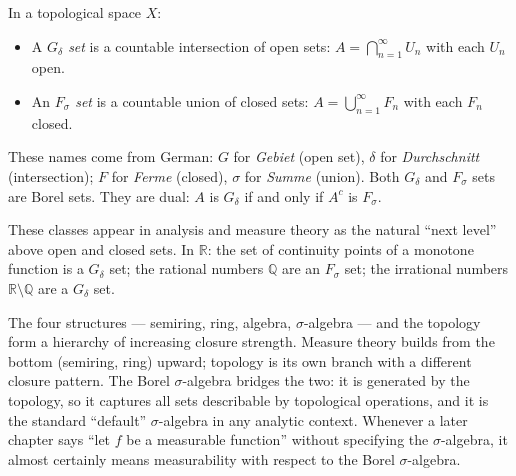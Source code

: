 \begin{example*}
\label{ex:Fsigma-Gdelta}
In a topological space $X$:
\begin{itemize}
\item A \emph{$G_\delta$ set} is a countable intersection of open sets:
  $A = \bigcap_{n=1}^\infty U_n$ with each $U_n$ open.
\item An \emph{$F_\sigma$ set} is a countable union of closed sets:
  $A = \bigcup_{n=1}^\infty F_n$ with each $F_n$ closed.
\end{itemize}
These names come from German: $G$ for \emph{Gebiet} (open set), $\delta$ for
\emph{Durchschnitt} (intersection); $F$ for \emph{Ferme} (closed), $\sigma$
for \emph{Summe} (union). Both $G_\delta$ and $F_\sigma$ sets are Borel sets.
They are dual: $A$ is $G_\delta$ if and only if $A^c$ is $F_\sigma$.

These classes appear in analysis and measure theory as the natural ``next
level'' above open and closed sets. In $\mathbb{R}$: the set of continuity
points of a monotone function is a $G_\delta$ set; the rational numbers
$\mathbb{Q}$ are an $F_\sigma$ set; the irrational numbers $\mathbb{R}
\setminus \mathbb{Q}$ are a $G_\delta$ set.
\end{example*}

\begin{remark*}[Transition]
The four structures — semiring, ring, algebra, $\sigma$-algebra — and the
topology form a hierarchy of increasing closure strength. Measure theory
builds from the bottom (semiring, ring) upward; topology is its own branch
with a different closure pattern. The Borel $\sigma$-algebra bridges the two:
it is generated by the topology, so it captures all sets describable by
topological operations, and it is the standard ``default'' $\sigma$-algebra
in any analytic context. Whenever a later chapter says ``let $f$ be a
measurable function'' without specifying the $\sigma$-algebra, it almost
certainly means measurability with respect to the Borel $\sigma$-algebra.
\end{remark*}
